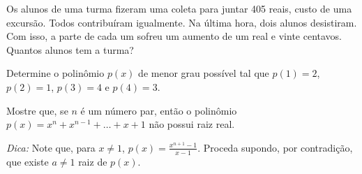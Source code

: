 \begin{exercise}
    Os alunos de uma turma fizeram uma coleta para juntar 405 reais,
custo de uma excursão. Todos contribuíram igualmente. Na última
hora, dois alunos desistiram. Com isso, a parte de cada um sofreu um
aumento de um real e vinte centavos. Quantos alunos tem a turma?
\end{exercise}

\begin{exercise}
    Determine o polinômio $p(x)$ de menor grau possível tal que
$p(1) = 2$, $p(2)=1$, $p(3) = 4$ e $p(4) = 3$.
\end{exercise}

\begin{exercise}
Mostre que, se $n$ é um número par, então o polinômio $p(x) =
x^n + x^{n-1} + \dots + x+1$ não possui raiz real.

\noindent \emph{Dica: } Note que, para $x \neq 1$, $p(x) =
\frac{x^{n+1}-1}{x-1}$. Proceda supondo, por contradição, que existe
$a \neq 1$ raiz de $p(x)$.
\end{exercise}